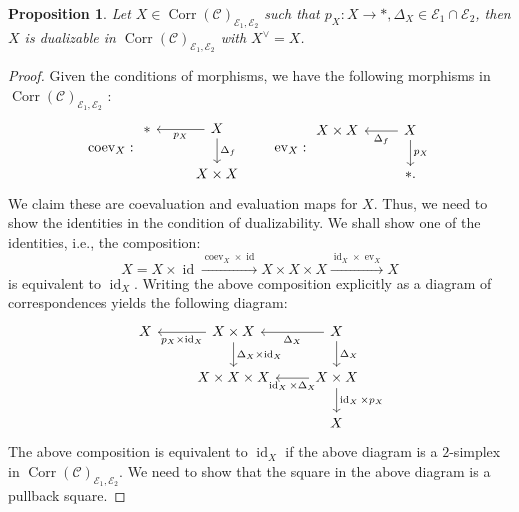 \documentclass[14pt]{article}
\newtheorem{proposition}[theorem]{Proposition}
\theoremstyle{definition}
\newcommand{\E}{\mathcal{E}}
\newcommand{\op}[1]{\operatorname{#1}}
\newcommand{\Ca}{\mathcal{C}}
\numberwithin{subsection}{section}
\begin{document}
\begin{proposition}\label{dualizableobjinCorr}
    Let $X \in \op{Corr}(\Ca)_{\E_1,\E_2}$ such that $p_X: X \to *, \Delta_X \in \E_1 \cap \E_2$, then $X$ is dualizable in $\op{Corr}(\Ca)_{\E_1,\E_2}$ with $X^{\vee}=X$. 
\end{proposition}
\begin{proof}
Given the conditions of morphisms, we have the following morphisms in $\op{Corr}(\Ca)_{\E_1,\E_2}$ :
\begin{equation}
    \op{coev}_X :\begin{tikzcd}
        * & X \arrow[l,"p_X"]\arrow[d,"\Delta_f"] \\
        {} & X \times X
    \end{tikzcd}\quad\quad \op{ev}_X:
    \begin{tikzcd}
        X \times X & X \arrow[l,"\Delta_f"] \arrow[d,"p_X"] \\
        {} & *.
    \end{tikzcd}
\end{equation}
We claim these are coevaluation and evaluation maps for $X$. Thus, we need to show the identities in the condition of dualizability. We shall show one of the identities, i.e., the composition:
\begin{equation}
    X = X \times \op{id} \xrightarrow{ \op{coev}_X \times \op{id}} X \times X \times X \xrightarrow{\op{id}_X \times \op{ev}_X} X
\end{equation}
is equivalent to $\op{id}_X$.  Writing the above composition explicitly as a diagram of correspondences yields the following diagram:
\begin{equation}
    \begin{tikzcd}
        X & X \times X \arrow[l,"p_X \times \op{id}_X"] \arrow[d,"\Delta_X \times \op{id}_X"] & X \arrow[l,"\Delta_X"] \arrow[d,"\Delta_X"] \\
        {} & X \times X \times X  & X  \times X \arrow[l,"\op{id}_X \times \Delta_X"] \arrow[d,"\op{id}_X \times p_X"] \\
        {} & {} & X
    \end{tikzcd}
\end{equation}
 The above composition is equivalent to $\op{id}_X$ if the above diagram is a $2$-simplex in  $\op{Corr}(\Ca)_{\E_1,\E_2}$. We need to show that the square in the above diagram is a pullback square. 

\end{proof}
\end{document}
